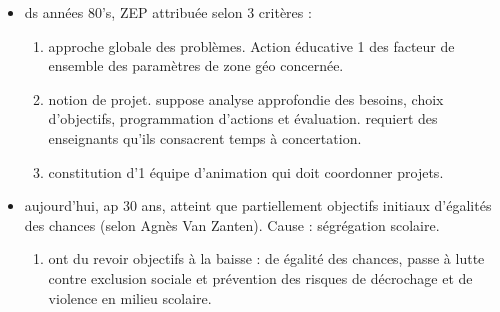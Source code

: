 \documentclass[12pt]{report}
\begin{document}
\begin{itemize}
\begin{itemize}
\item ds années 80's, ZEP attribuée selon 3 critères : 
\begin{enumerate}
\item approche globale des problèmes. Action éducative 1 des facteur de ensemble des paramètres de zone géo concernée.  \\
\item notion de projet. suppose analyse approfondie des besoins, choix d'objectifs, programmation d'actions et évaluation. requiert des enseignants qu'ils consacrent temps à concertation. \\
\item constitution d'1 équipe d'animation qui doit coordonner projets.

\end{enumerate}


\item aujourd'hui, ap 30 ans, atteint que partiellement objectifs initiaux d'égalités des chances (selon Agnès Van Zanten). Cause : ségrégation scolaire.
\begin{enumerate}
\item ont du revoir objectifs à la baisse : de égalité des chances, passe à lutte contre exclusion sociale et prévention des risques de décrochage et de violence en milieu scolaire.
\end{enumerate}

\end{itemize}
\end{itemize}
\end{document}
